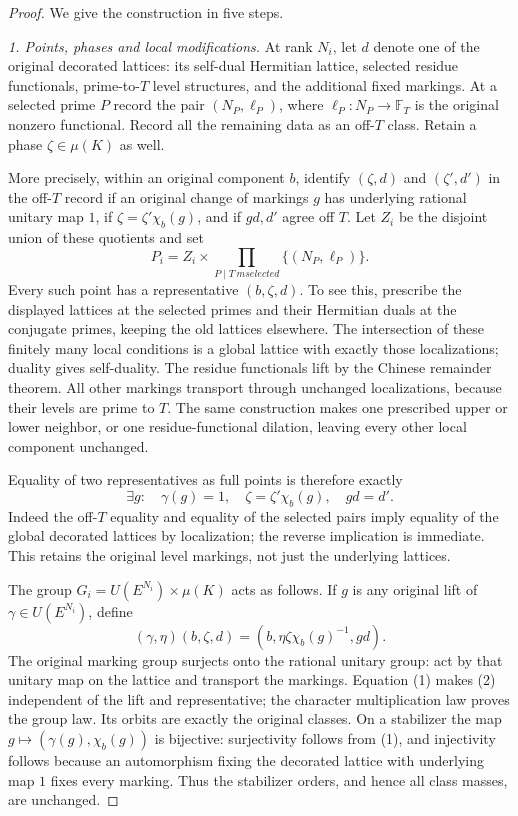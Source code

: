 \begin{proof}
We give the construction in five steps.

\emph{1. Points, phases and local modifications.}
At rank $N_i$, let $d$ denote one of the original decorated lattices:
its self-dual Hermitian lattice, selected residue functionals,
prime-to-$T$ level structures, and the additional fixed markings.
At a selected prime $P$ record the pair
$(N_P,\ell_P)$, where $\ell_P:N_P\to\mathbb F_T$ is the original
nonzero functional.  Record all the remaining data as an off-$T$
class.  Retain a phase $\zeta\in\mu(K)$ as well.

More precisely, within an original component $b$, identify
$(\zeta,d)$ and $(\zeta',d')$ in the off-$T$ record if an original
change of markings $g$ has underlying rational unitary map $1$,
if $\zeta=\zeta'\chi_b(g)$, and if $gd,d'$ agree off $T$.
Let $Z_i$ be the disjoint union of these quotients and set
\[
 P_i=Z_i\times\prod_{P\mid T\ {
m selected}}
           \{(N_P,\ell_P)\}.
\]
Every such point has a representative $(b,\zeta,d)$.  To see this,
prescribe the displayed lattices at the selected primes and their
Hermitian duals at the conjugate primes, keeping the old lattices
elsewhere.  The intersection of these finitely many local conditions
is a global lattice with exactly those localizations; duality gives
self-duality.  The residue functionals lift by the Chinese remainder
theorem.  All other markings transport through unchanged localizations,
because their levels are prime to $T$.  The same construction makes
one prescribed upper or lower neighbor, or one residue-functional
dilation, leaving every other local component unchanged.

Equality of two representatives as full points is therefore exactly
\[
 \exists g:\quad \gamma(g)=1,\quad
 \zeta=\zeta'\chi_b(g),\quad gd=d'.                 \tag{1}
\]
Indeed the off-$T$ equality and equality of the selected pairs imply
equality of the global decorated lattices by localization; the reverse
implication is immediate.  This retains the original level markings,
not just the underlying lattices.

The group $G_i=U(E^{N_i})\times\mu(K)$ acts as follows.  If
$g$ is any original lift of $\gamma\in U(E^{N_i})$, define
\[
 (\gamma,\eta)(b,\zeta,d)
   =(b,\eta\zeta\chi_b(g)^{-1},gd).                 \tag{2}
\]
The original marking group surjects onto the rational unitary group:
act by that unitary map on the lattice and transport the markings.
Equation (1) makes (2) independent of the lift and representative;
the character multiplication law proves the group law.  Its orbits
are exactly the original classes.  On a stabilizer the map
$g\mapsto(\gamma(g),\chi_b(g))$ is bijective: surjectivity follows
from (1), and injectivity follows because an automorphism fixing the
decorated lattice with underlying map $1$ fixes every marking.
Thus the stabilizer orders, and hence all class masses, are unchanged.


\end{proof}
